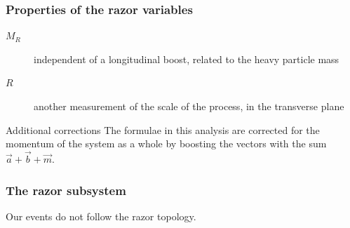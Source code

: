 \documentclass[ukenglish]{beamer}
\begin{document}
\begin{frame}
    \frametitle{Properties of the razor variables}
    \begin{description}
        \item[$M_R$] independent of a longitudinal boost, related to the
            heavy particle mass
        \item[$R$] another measurement of the scale of the process, in the transverse plane
    \end{description}

    \begin{block}
        {Additional corrections}
        The formulae in this analysis are corrected for the momentum of the
        system as a whole by boosting the vectors with the sum $\vec{a} + \vec{b} +
        \vec{m}.$
    \end{block}
\end{frame}

\begin{frame}
    \frametitle{The razor subsystem}
    \alert{Our events do not follow the razor topology.}

\end{frame}
\end{document}
